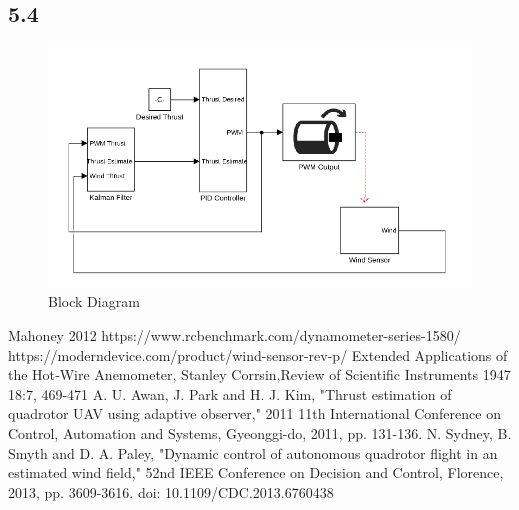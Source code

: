 \documentclass[conference]{IEEEtran}
\begin{document}
	\subsection{5.4}
		\begin{figure}[b]
		\includegraphics[width=\textwidth / 2]{images/block_diagram.png}
		\caption{Block Diagram}
		\label{block_diagram}
	\end{figure}
	\begin{thebibliography}{99}
		 Mahoney 2012
		 https://www.rcbenchmark.com/dynamometer-series-1580/
		 https://moderndevice.com/product/wind-sensor-rev-p/
		 Extended Applications of the Hot‐Wire Anemometer, Stanley Corrsin,Review of Scientific Instruments 1947 18:7, 469-471 
		 A. U. Awan, J. Park and H. J. Kim, "Thrust estimation of quadrotor UAV using adaptive observer," 2011 11th International Conference on Control, Automation and Systems, Gyeonggi-do, 2011, pp. 131-136.
		 N. Sydney, B. Smyth and D. A. Paley, "Dynamic control of autonomous quadrotor flight in an estimated wind field," 52nd IEEE Conference on Decision and Control, Florence, 2013, pp. 3609-3616.
		doi: 10.1109/CDC.2013.6760438
		
	\end{thebibliography}
\end{document}
